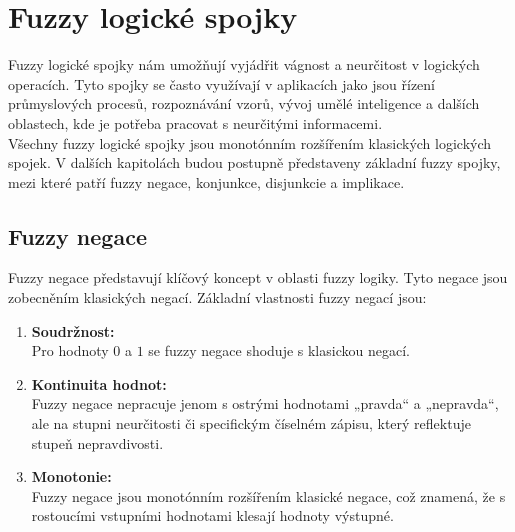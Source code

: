 \section{Fuzzy logick\'e spojky}

Fuzzy logické spojky n\'am umo\v z\v nují vyjádřit vágnost a neurčitost v logických operacích. Tyto spojky se často využívají v aplikacích jako jsou řízení průmyslových procesů, rozpoznávání vzorů, vývoj umělé inteligence a dalších oblastech, kde je potřeba pracovat s neurčitými informacemi.\\

V\v sechny fuzzy logick\'e spojky jsou monot\'onn\'im roz\v s\'i\v ren\'im klasick\'ych logick\'ych spojek. V dalších kapitolách budou postupně představeny základní fuzzy spojky, mezi kter\'e  patří 
fuzzy negace, konjunkce, disjunkcie a implikace. 

\subsection{Fuzzy negace}

Fuzzy negace představují klíčový koncept v oblasti fuzzy logiky. Tyto negace jsou zobecn\v en\'im klasick\'ych negac\'i. Základní vlastnosti fuzzy negací jsou:

\begin{enumerate}
\item \textbf{Soudržnost:}\\
Pro hodnoty $0$ a $1$ se fuzzy negace shoduje s klasickou negac\'i.
    \item \textbf{Kontinuita hodnot:} \\
        Fuzzy negace nepracuje jenom s  ostrými hodnotami „pravda“ a „nepravda“, ale na stupni neurčitosti či specifickým číselném zápisu, který reflektuje stupeň nepravdivosti.
    \item \textbf{Monotonie:} \\
        Fuzzy negace jsou monot\'onn\'im roz\v s\'i\v ren\'im klasick\'e negace, což znamená, že s rostoucími vstupn\'imi hodnotami klesaj\'i hodnoty výstupn\'e.
    
\end{enumerate}

